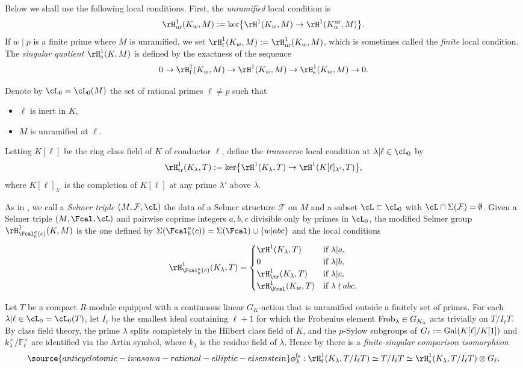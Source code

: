 Below we shall use the following local conditions. First, the \emph{unramified} local condition is
\[
\rH^1_{\rm ur}(K_w,M):={\rm ker}\bigl\{\rH^1(K_w,M)\rightarrow\rH^1(K_w^{\rm ur},M)\bigr\}.
\]
If $w\mid p$ is a finite prime where $M$ is unramified, we set $\rH^1_{\rm f}(K_w,M):=\rH^1_{\rm ur}(K_w,M)$, which is sometimes called the \emph{finite} local condition.
The \emph{singular quotient} $\rH^1_{\rm s}(K,M)$ is defined by the exactness of the sequence
\[
0\rightarrow\rH^1_{\rm f}(K_w,M)\rightarrow\rH^1(K_w,M)\rightarrow\rH^1_{\rm s}(K_w,M)\rightarrow 0.
\]

Denote by $\cL_0=\cL_0(M)$ the set of rational primes $\ell\neq p$ such that
\begin{itemize}
\item $\ell$ is inert in $K$,
\item $M$ is unramified at $\ell$.
\end{itemize}
Letting $K[\ell]$ be the ring class field of $K$ of conductor $\ell$, define the \emph{transverse} local condition at $\lambda\vert\ell\in\cL_0$ by
\[
\rH^1_{\rm tr}(K_\lambda,T):={\rm ker}\bigl\{\rH^1(K_\lambda,T)\rightarrow\rH^1(K[\ell]_{\lambda'},T)\bigr\},
\]
where $K[\ell]_{\lambda'}$ is the completion of $K[\ell]$ at any prime $\lambda'$ above $\lambda$.

As in \cite{howard}, we call a \emph{Selmer triple} $(M,\mathcal{F},\cL)$ the data of a Selmer structure $\mathcal{F}$ on $M$ and a subset $\cL\subset\cL_0$ with $\cL\cap\Sigma(\mathcal{F})=\emptyset$. Given a Selmer triple $(M,\Fcal,\cL)$ and pairwise
coprime integers $a,b,c$ divisible only by primes in $\cL_0$, the modified Selmer group $\rH^1_{\Fcal^a_b(c)}(K,M)$ is the one defined by
$\Sigma(\Fcal^a_b(c))=\Sigma(\Fcal)\cup\{w\vert abc\}$
and the local conditions
\[
\rH^1_{\Fcal^a_b(c)}(K_\lambda,T)
=\begin{cases}
\rH^1(K_\lambda,T) &\text{if }\lambda\vert a,\\
0 &\text{if }\lambda\vert b,\\
\rH^1_{\tr}(K_\lambda,T) &\text{if }\lambda\vert c, \\
\rH^1_{\Fcal}(K_w,T) & \text{if }\lambda\nmid abc.
\end{cases}
\]

Let $T$ be a compact $R$-module equipped with a continuous linear $G_K$-action
that is unramified outside a finitely set of primes.
For each $\lambda\vert\ell\in\cL_0 = \cL_0(T)$, let $I_\ell$ be the smallest ideal containing $\ell+1$ for which the Frobenius element ${\rm Frob}_\lambda\in G_{K_\lambda}$ acts trivially on $T/I_\ell T$. By class field theory, the prime $\lambda$ splits completely in the Hilbert class field of $K$, and the $p$-Sylow subgroups of $G_\ell:={\rm Gal}(K[\ell]/K[1])$ and $k_\lambda^\times/\mathbb{F}_\ell^\times$ are identified via the Artin symbol, where $k_\lambda$ is the residue field of $\lambda$. Hence by \cite[Lem.~1.2.1]{mazrub} there is a \emph{finite-singular comparison isomorphism}
\begin{equation}\label{eq:f-s}
\source{anticyclotomic-iwasawa-rational-elliptic-eisenstein}
\phi_\lambda^{\rm fs}:\rH^1_{\rm f}(K_\lambda,T/I_\ell T)\simeq T/I_\ell T\simeq\rH^1_{\rm s}(K_\lambda,T/I_\ell T)\otimes G_\ell.
\end{equation}

